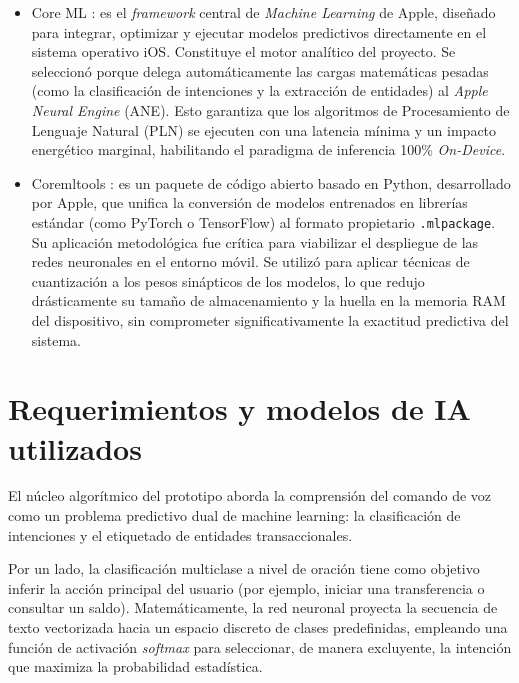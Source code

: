 \begin{itemize}
    \item Core ML \citep{apple2026coreml}: es el \textit{framework} central de \textit{Machine Learning} de Apple, diseñado para integrar, optimizar y ejecutar modelos predictivos directamente en el sistema operativo iOS. Constituye el motor analítico del proyecto. Se seleccionó porque delega automáticamente las cargas matemáticas pesadas (como la clasificación de intenciones y la extracción de entidades) al \textit{Apple Neural Engine} (ANE). Esto garantiza que los algoritmos de Procesamiento de Lenguaje Natural (PLN) se ejecuten con una latencia mínima y un impacto energético marginal, habilitando el paradigma de inferencia 100\% \textit{On-Device}.

    \item Coremltools \citep{apple2026coremltools}: es un paquete de código abierto basado en Python, desarrollado por Apple, que unifica la conversión de modelos entrenados en librerías estándar (como PyTorch o TensorFlow) al formato propietario \linebreak \lstinline|.mlpackage|. Su aplicación metodológica fue crítica para viabilizar el despliegue de las redes neuronales en el entorno móvil. Se utilizó para aplicar técnicas de cuantización a los pesos sinápticos de los modelos, lo que redujo drásticamente su tamaño de almacenamiento y la huella en la memoria RAM del dispositivo, sin comprometer significativamente la exactitud predictiva del sistema.

\end{itemize}

\section{Requerimientos y modelos de IA utilizados}

El núcleo algorítmico del prototipo aborda la comprensión del comando de voz como un problema predictivo dual de machine learning: la clasificación de intenciones y el etiquetado de entidades transaccionales.

Por un lado, la clasificación multiclase a nivel de oración tiene como objetivo inferir la acción principal del usuario (por ejemplo, iniciar una transferencia o consultar un saldo). Matemáticamente, la red neuronal proyecta la secuencia de texto vectorizada hacia un espacio discreto de clases predefinidas, empleando una función de activación \textit{softmax} para seleccionar, de manera excluyente, la intención que maximiza la probabilidad estadística.

